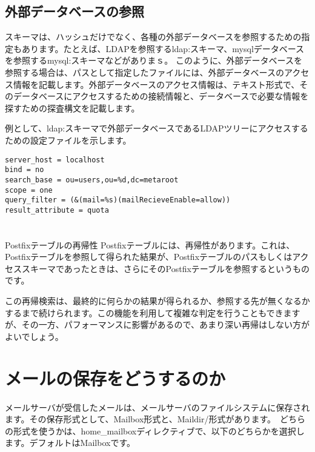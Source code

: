 \subsection{外部データベースの参照}

スキーマは、ハッシュだけでなく、各種の外部データベースを参照するための指定もあります。たとえば、LDAPを参照するldap:スキーマ、mysqlデータベースを参照するmysql:スキーマなどがありまｓ。
このように、外部データベースを参照する場合は、パスとして指定したファイルには、外部データベースのアクセス情報を記載します。外部データベースのアクセス情報は、テキスト形式で、そのデータベースにアクセスするための接続情報と、データベースで必要な情報を探すための探査構文を記載します。

例として、ldap:スキーマで外部データベースであるLDAPツリーにアクセスするための設定ファイルを示します。

\begin{lstlisting}[basicstyle=\ttfamily\footnotesize, frame=single]
server_host = localhost
bind = no
search_base = ou=users,ou=%d,dc=metaroot
scope = one
query_filter = (&(mail=%s)(mailRecieveEnable=allow))
result_attribute = quota
\end{lstlisting}


\section*{}
\begin{itembox}[l]{Postfixテーブルの再帰性}
Postfixテーブルには、再帰性があります。これは、Postfixテーブルを参照して得られた結果が、Postfixテーブルのパスもしくはアクセススキーマであったときは、さらにそのPostfixテーブルを参照するというものです。

この再帰検索は、最終的に何らかの結果が得られるか、参照する先が無くなるかするまで続けられます。この機能を利用して複雑な判定を行うこともできますが、その一方、パフォーマンスに影響があるので、あまり深い再帰はしない方がよいでしょう。

\end{itembox}



\section{メールの保存をどうするのか}
メールサーバが受信したメールは、メールサーバのファイルシステムに保存されます。その保存形式として、Mailbox形式と、Maildir/形式があります。　どちらの形式を使うかは、home\_mailboxディレクティブで、以下のどちらかを選択します。デフォルトはMailboxです。

